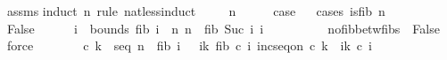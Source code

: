 \begin{isabellebody}
\ assms\isanewline
{}\isamarkupfalse%
{\isacharparenleft}{\kern0pt}induct\ n\ rule{\isacharcolon}{\kern0pt}\ nat{\isacharunderscore}{\kern0pt}less{\isacharunderscore}{\kern0pt}induct{\isacharparenright}{\kern0pt}\isanewline
\ \ \isamarkupfalse%
\ {\isacharparenleft}{\kern0pt}{}\ n{\isacharparenright}{\kern0pt}\isanewline
\ \ \isamarkupfalse%
\ \isamarkupfalse%
\ {\isacharquery}{\kern0pt}case\isanewline
\ \ \isamarkupfalse%
{\isacharparenleft}{\kern0pt}cases\ {\isachardoublequoteopen}is{\isacharunderscore}{\kern0pt}fib\ n{\isachardoublequoteclose}{\isacharparenright}{\kern0pt}\isanewline
\ \ \ \ \isamarkupfalse%
\ False\isanewline
\ \ \ \ \isamarkupfalse%
\ i\ \ bounds{\isacharcolon}{\kern0pt}\ {\isachardoublequoteopen}fib\ i\ {\isacharless}{\kern0pt}\ n{\isachardoublequoteclose}\ {\isachardoublequoteopen}n\ {\isacharless}{\kern0pt}\ fib\ {\isacharparenleft}{\kern0pt}Suc\ i{\isacharparenright}{\kern0pt}{\isachardoublequoteclose}\ {\isachardoublequoteopen}i\ {\isachargreater}{\kern0pt}\ {}{\isachardoublequoteclose}\isanewline
\ \ \ \ \ \ \isamarkupfalse%
\ no{\isacharunderscore}{\kern0pt}fib{\isacharunderscore}{\kern0pt}betw{\isacharunderscore}{\kern0pt}fibs\ {}{\isacharparenleft}{\kern0pt}{}{\isacharparenright}{\kern0pt}\ False\ \isamarkupfalse%
\ force\isanewline
\ \ \ \ \isamarkupfalse%
\ \isamarkupfalse%
\ c\ k\ \ seq{\isacharcolon}{\kern0pt}\ {\isachardoublequoteopen}{\isacharparenleft}{\kern0pt}n\ {\isacharminus}{\kern0pt}\ fib\ i{\isacharparenright}{\kern0pt}\ {\isacharequal}{\kern0pt}\ {\isacharparenleft}{\kern0pt}{\isasymSum}\ i{\isacharequal}{\kern0pt}{}{\isachardot}{\kern0pt}{\isachardot}{\kern0pt}k{\isachardot}{\kern0pt}\ fib\ {\isacharparenleft}{\kern0pt}c\ i{\isacharparenright}{\kern0pt}{\isacharparenright}{\kern0pt}{\isachardoublequoteclose}\ {\isachardoublequoteopen}inc{\isacharunderscore}{\kern0pt}seq{\isacharunderscore}{\kern0pt}on\ c\ {\isacharbraceleft}{\kern0pt}{}{\isachardot}{\kern0pt}{\isachardot}{\kern0pt}k{\isacharminus}{\kern0pt}{}{\isacharbraceright}{\kern0pt}{\isachardoublequoteclose}\ {\isachardoublequoteopen}{\isasymforall}\ i{\isasymin}{\isacharbraceleft}{\kern0pt}{}{\isachardot}{\kern0pt}{\isachardot}{\kern0pt}k{\isacharbraceright}{\kern0pt}{\isachardot}{\kern0pt}\ c\ i\ {\isasymge}\ {}{\isachardoublequoteclose}\isanewline

\end{isabellebody}
